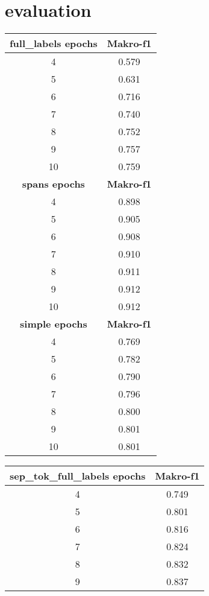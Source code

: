 \documentclass[12]{article}
\theoremstyle{mytheoremstyle}
\theoremstyle{mytheoremstyle}
\theoremstyle{myproblemstyle}
\begin{document}
  \section{evaluation\dotfill}
  \begin{table}[!h]
    \centering
    \begin{tabular}{c|c} 
      \textbf{full\_labels epochs} & \textbf{Makro-f1}\\ 
      \hline
      \hline
      4 & 0.579\\
      5 & 0.631\\
      6 & 0.716\\
      7 & 0.740\\
      8 & 0.752\\
      9 & 0.757\\
      10 & 0.759 \vspace{3ex}\\
      \textbf{spans epochs} & \textbf{Makro-f1}\\
      \hline
      \hline
      4 & 0.898\\
      5 & 0.905\\
      6 & 0.908\\
      7 & 0.910\\
      8 & 0.911\\
      9 & 0.912\\
      10 & 0.912 \vspace{3ex}\\
      \textbf{simple epochs} & \textbf{Makro-f1}\\
      \hline
      \hline
      4 & 0.769\\
      5 & 0.782\\
      6 & 0.790\\
      7 & 0.796\\
      8 & 0.800\\
      9 & 0.801\\
      10 & 0.801\\
    \end{tabular}
    \quad
    \begin{tabular}{c|c} 
      \textbf{sep\_tok\_full\_labels epochs} & \textbf{Makro-f1}\\
      \hline
      \hline
      4 & 0.749\\
      5 & 0.801\\
      6 & 0.816\\
      7 & 0.824\\
      8 & 0.832\\
      9 & 0.837\\

\end{tabular}
\end{table}
\end{document}
